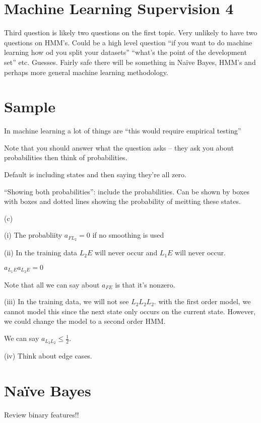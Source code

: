 \documentclass[10pt, a4paper]{article}
\begin{document}
\section*{Machine Learning Supervision 4}

Third question is likely two questions on the first topic. Very unlikely to have two questions on 
HMM's. Could be a high level question ``if you want to do machine learning how od you split your 
datasets'' ``what's the point of the development set'' etc. Guesses. Fairly safe there will be 
something in Na\"ive Bayes, HMM's and perhaps more general machine learning methodology.



\section*{Sample}

In machine learning a lot of things are ``this would require empirical testing''

Note that you should answer what the question asks -- they ask you about 
probabilities then think of probabilities.

Default is including states and then saying they're all zero.

``Showing both probabilities'': include the probabilities. Can be shown by boxes 
with boxes and dotted lines showing the probability of meitting these states.

(c)

(i) The probabliity $a_{FL_2} = 0$ if no smoothing is used

(ii) In the training data $L_2E$ will never occur and $L_1E$ will never occur.

$a_{L_1E} a_{L_2E} = 0$

Note that all we can say about $a_{FE}$ is that it's nonzero.

(iii) In the training data, we will not see $L_2L_2L_2$. with the first order model, we cannot 
model this since the next state only occurs on the current state. However, we could change the model to 
a second order HMM.

We can say $a_{L_2L_2} \leq \frac{1}{2}$.

(iv) Think about edge cases.

\section*{Na\"ive Bayes}

Review binary features!!
\end{document}
